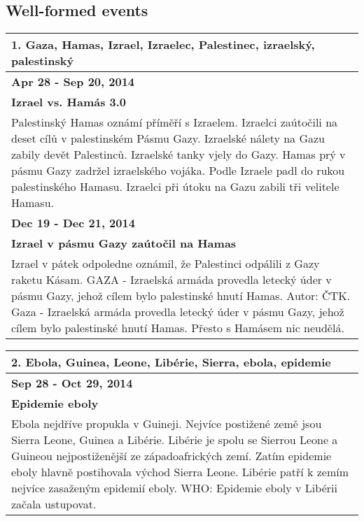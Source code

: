 \subsection*{Well-formed events}
\begin{tabularx}{\linewidth}{p{\linewidth}} \toprule[1.5pt]
\bf 1. Gaza, Hamas, Izrael, Izraelec, Palestinec, izraelský, palestinský \\ \midrule
\bf Apr 28 - Sep 20, 2014 \\ \midrule
\bf Izrael vs. Hamás 3.0 \\
Palestinský Hamas oznámí příměří s Izraelem. Izraelci zaútočili na deset cílů v palestinském Pásmu Gazy. Izraelské nálety na Gazu zabily devět Palestinců. Izraelské tanky vjely do Gazy. Hamas prý v pásmu Gazy zadržel izraelského vojáka. Podle Izraele padl do rukou palestinského Hamasu. Izraelci při útoku na Gazu zabili tři velitele Hamasu. \\ \bottomrule[1.25pt]

\bf Dec 19 - Dec 21, 2014 \\ \midrule
\bf Izrael v pásmu Gazy zaútočil na Hamas \\
Izrael v pátek odpoledne oznámil, že Palestinci odpálili z Gazy raketu Kásam. GAZA - Izraelská armáda provedla letecký úder v pásmu Gazy, jehož cílem bylo palestinské hnutí Hamas. Autor: ČTK. Gaza - Izraelská armáda provedla letecký úder v pásmu Gazy, jehož cílem bylo palestinské hnutí Hamas. Přesto s Hamásem nic neudělá. \\ \bottomrule[1.25pt]
\end{tabularx}

\par
\newpage

\begin{tabularx}{\linewidth}{p{\linewidth}} \toprule[1.5pt]
\bf 2. Ebola, Guinea, Leone, Libérie, Sierra, ebola, epidemie \\ \midrule
\bf Sep 28 - Oct 29, 2014 \\ \midrule
\bf Epidemie eboly \\
Ebola nejdříve propukla v Guineji. Nejvíce postižené země jsou Sierra Leone, Guinea a Libérie. Libérie je spolu se Sierrou Leone a Guineou nejpostiženější ze západoafrických zemí. Zatím epidemie eboly hlavně postihovala východ Sierra Leone. Libérie patří k zemím nejvíce zasaženým epidemií eboly. WHO: Epidemie eboly v Libérii začala ustupovat. \\ \bottomrule[1.25pt]
\end{tabularx}
\par

